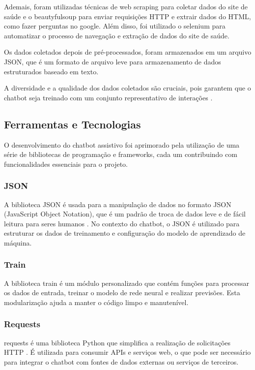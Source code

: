 \documentclass[conference]{IEEEtran}
\begin{document}
Ademais, foram utilizadas técnicas de web scraping para coletar dados do site de saúde e o 
beautyfulsoup para enviar requisições HTTP e extrair dados do HTML, como fazer perguntas no google. Além disso,
foi utilizado o selenium para automatizar o processo de navegação e extração de dados do site de saúde.

Os dados coletados depois de pré-processados, foram armazenados em um arquivo JSON, 
que é um formato de arquivo leve para armazenamento de dados estruturados baseado em texto.

A diversidade e a qualidade dos dados coletados são cruciais, 
pois garantem que o chatbot seja treinado com um conjunto representativo de interações \cite{Lopez2018}.



\subsection{Ferramentas e Tecnologias}

O desenvolvimento do chatbot assistivo foi aprimorado pela utilização de uma série de 
bibliotecas de programação e frameworks, 
cada um contribuindo com funcionalidades essenciais para o projeto.

\subsubsection{JSON}
A biblioteca JSON é usada para a manipulação de dados no 
formato JSON (JavaScript Object Notation), que é um padrão de troca de dados leve e de fácil leitura 
para seres humanos \cite{Crockford2006}. 
No contexto do chatbot, o JSON é utilizado para estruturar os dados 
de treinamento e configuração do modelo de aprendizado de máquina.

\subsubsection{Train}
A biblioteca train é um módulo personalizado que contém funções para processar os dados de entrada, 
treinar o modelo de rede neural e realizar previsões. 
Esta modularização ajuda a manter o código limpo e manutenível.

\subsubsection{Requests}
requests é uma biblioteca Python que simplifica a realização de solicitações HTTP \cite{Reitz2016}. 
É utilizada para consumir APIs e serviços web, o que pode ser necessário para integrar 
o chatbot com fontes de dados externas ou serviços de terceiros.
\end{document}
